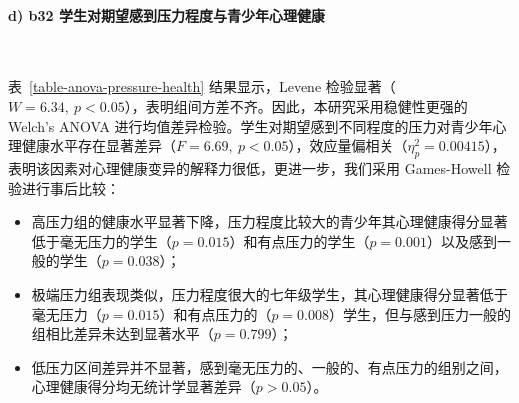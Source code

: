 \documentclass[zihao = -4, linespread = 1.5]{article}
\begin{document}
\paragraph*{d) b32 学生对期望感到压力程度与青少年心理健康}~{}

表~\ref{table-anova-pressure-health} 结果显示，Levene 检验显著（$W=6.34,\ p<0.05$），表明组间方差不齐。因此，本研究采用稳健性更强的 Welch's ANOVA 进行均值差异检验。学生对期望感到不同程度的压力对青少年心理健康水平存在显著差异（$F=6.69,\ p<0.05$），效应量偏相关（$\eta^2_p = 0.00415$），表明该因素对心理健康变异的解释力很低，更进一步，我们采用 Games-Howell 检验进行事后比较：

\begin{itemize}
    \item 高压力组的健康水平显著下降，压力程度比较大的青少年其心理健康得分显著低于毫无压力的学生（$p=0.015$）和有点压力的学生（$p=0.001$）以及感到一般的学生（$p=0.038$）；
    \item 极端压力组表现类似，压力程度很大的七年级学生，其心理健康得分显著低于毫无压力（$p=0.015$）和有点压力的（$p=0.008$）学生，但与感到压力一般的组相比差异未达到显著水平（$p=0.799$）；
    \item 低压力区间差异并不显著，感到毫无压力的、一般的、有点压力的组别之间，心理健康得分均无统计学显著差异（$p>0.05$）。
\end{itemize}
\end{document}
